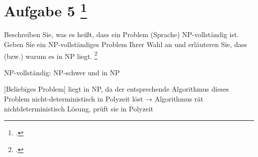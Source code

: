 \documentclass{lehramt-informatik-aufgabe}
\begin{document}
\section{Aufgabe 5
\footcite{46115:2016:03}}

Beschreiben Sie, was es heißt, dass ein Problem (Sprache) NP-vollständig
ist. Geben Sie ein NP-vollständiges Problem Ihrer Wahl an und erläuteren
Sie, dass (bzw.) warum es in NP liegt.
\footcite[Seite 15, Aufgabe 11]{theo:ab:4}

\begin{liAntwort}
NP-vollständig: NP-schwer und in NP

[Beliebiges Problem] liegt in NP, da der entsprechende Algorithmus
dieses Problem nicht-deterministisch in Polyzeit löst → Algorithmus rät
nichtdeterministisch Lösung, prüft sie in Polyzeit
\end{liAntwort}
\end{document}
